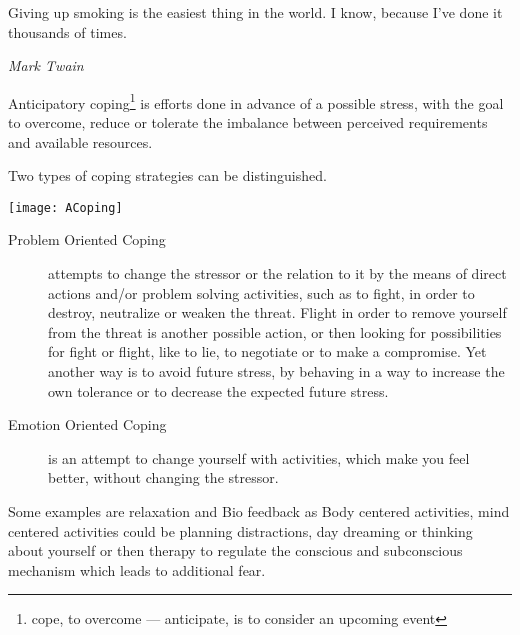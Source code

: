 \documentclass[../Book.Stress_regulation.tex]{subfiles}
\begin{document}

\epigraph{Giving up smoking is the easiest thing in the world. I know, because I've done it thousands of times.}{\textit{Mark Twain}}

Anticipatory coping\footnote{cope, to overcome --- anticipate, is to consider an upcoming event} is efforts done {in advance} of a possible stress,  with the goal to {overcome}, reduce or tolerate the {imbalance between perceived requirements and available resources}.

Two types of coping strategies can be distinguished.

\texttt{[image: ACoping]}

 \begin{description}
\item[Problem Oriented Coping] attempts to change the stressor or the relation to it by the means of {direct actions} and/or problem solving activities, such as to fight, in order to destroy, neutralize or weaken the threat. Flight in order to remove yourself from the threat is another possible action, or then looking for possibilities for fight or flight, like to lie, to negotiate or to make a compromise. Yet another way is to avoid future stress, by behaving in a way to increase the own tolerance or to decrease the expected future stress.
\item[Emotion Oriented Coping] is an attempt to change yourself with activities, which make you {feel better}, without changing the stressor.
\end{description}

Some examples are relaxation and Bio feedback as Body centered activities, mind centered activities could be planning distractions, day dreaming or thinking about yourself or then therapy to regulate the conscious and subconscious mechanism which leads to additional fear.
\end{document}

